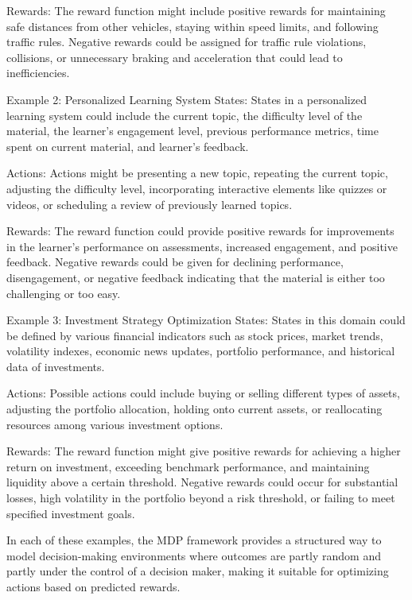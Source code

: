 \documentclass[12pt,letterpaper]{exam}
\begin{document}
\begin{questions}
Rewards: The reward function might include positive rewards for maintaining safe distances from other vehicles, staying within speed limits, and following traffic rules. Negative rewards could be assigned for traffic rule violations, collisions, or unnecessary braking and acceleration that could lead to inefficiencies.

Example 2: Personalized Learning System
States: States in a personalized learning system could include the current topic, the difficulty level of the material, the learner’s engagement level, previous performance metrics, time spent on current material, and learner's feedback.

Actions: Actions might be presenting a new topic, repeating the current topic, adjusting the difficulty level, incorporating interactive elements like quizzes or videos, or scheduling a review of previously learned topics.

Rewards: The reward function could provide positive rewards for improvements in the learner's performance on assessments, increased engagement, and positive feedback. Negative rewards could be given for declining performance, disengagement, or negative feedback indicating that the material is either too challenging or too easy.

Example 3: Investment Strategy Optimization
States: States in this domain could be defined by various financial indicators such as stock prices, market trends, volatility indexes, economic news updates, portfolio performance, and historical data of investments.

Actions: Possible actions could include buying or selling different types of assets, adjusting the portfolio allocation, holding onto current assets, or reallocating resources among various investment options.

Rewards: The reward function might give positive rewards for achieving a higher return on investment, exceeding benchmark performance, and maintaining liquidity above a certain threshold. Negative rewards could occur for substantial losses, high volatility in the portfolio beyond a risk threshold, or failing to meet specified investment goals.

In each of these examples, the MDP framework provides a structured way to model decision-making environments where outcomes are partly random and partly under the control of a decision maker, making it suitable for optimizing actions based on predicted rewards.




\end{questions}
\end{document}
